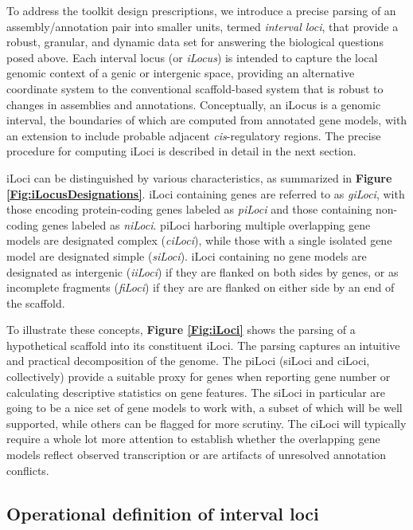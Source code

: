 To address the toolkit design prescriptions, we introduce a precise parsing of an assembly/annotation pair into smaller units, termed \textit{interval loci}, that provide a robust, granular, and dynamic data set for answering the biological questions posed above.
Each interval locus (or \textit{iLocus}) is intended to capture the local genomic context of a genic or intergenic space, providing an alternative coordinate system to the conventional scaffold-based system that is robust to changes in assemblies and annotations.
Conceptually, an iLocus is a genomic interval, the boundaries of which are computed from annotated gene models, with an extension to include probable adjacent \textit{cis}-regulatory regions.
The precise procedure for computing iLoci is described in detail in the next section.

iLoci can be distinguished by various characteristics, as summarized in \textbf{Figure \ref{Fig:iLocusDesignations}}.
iLoci containing genes are referred to as \textit{giLoci}, with those encoding protein-coding genes labeled as \textit{piLoci} and those containing non-coding genes labeled as \textit{niLoci}.
piLoci harboring multiple overlapping gene models are designated complex (\textit{ciLoci}), while those with a single isolated gene model are designated simple (\textit{siLoci}).
iLoci containing no gene models are designated as intergenic (\textit{iiLoci}) if they are flanked on both sides by genes, or as incomplete fragments (\textit{fiLoci}) if they are are flanked on either side by an end of the scaffold.

To illustrate these concepts, \textbf{Figure \ref{Fig:iLoci}} shows the parsing of a hypothetical scaffold into its constituent iLoci.
The parsing captures an intuitive and practical decomposition of the genome.
The piLoci (siLoci and ciLoci, collectively) provide a suitable proxy for genes when reporting gene number or calculating descriptive statistics on gene features.
The siLoci in particular are going to be a nice set of gene models to work with, a subset of which will be well supported, while others can be flagged for more scrutiny.
The ciLoci will typically require a whole lot more attention to establish whether the overlapping gene models reflect observed transcription or are artifacts of unresolved annotation conflicts.

\subsection*{Operational definition of interval loci}

